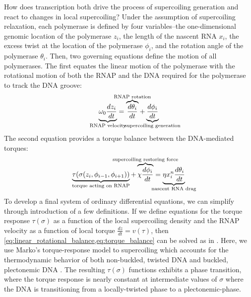 \documentclass[11pt]{article}
\begin{document}
How does transcription both drive the process of supercoiling generation and react to changes in local supercoiling? Under the assumption of supercoiling relaxation, each polymerase is defined by four variables--the one-dimensional genomic location of the polymerase \(z_i\), the length of the nascent RNA \(x_i\), the excess twist at the location of the polymerase \(\phi_i\), and the rotation angle of the polymerase \(\theta_i\). Then, two governing equations define the motion of all polymerases. The first equates the linear motion of the polymerase with the rotational motion of both the RNAP and the DNA required for the polymerase to track the DNA groove:
\begin{equation}
    \underbrace{\omega_0 \frac{dz_i}{dt}}_{\mathclap{\text{RNAP velocity}}} = \overbrace{\frac{d\theta_i}{dt}}^{\mathclap{\text{RNAP rotation}}} + \underbrace{\frac{d\phi_i}{dt}}_{\mathclap{\text{supercoiling generation}}}
\label{eq:linear_rotational_balance}
\end{equation}
The second equation provides a torque balance between the DNA-mediated torques:
\begin{equation}
    \underbrace{\tau(\sigma(z_i, \phi_{i-1}, \phi_{i+1}))}_{\mathclap{\text{torque acting on RNAP}}} + \overbrace{\chi \frac{d\phi_i}{dt}}^{\mathclap{\text{supercoiling restoring force}}}= \underbrace{\eta x_i^n \frac{d\theta_i}{dt}}_{\mathclap{\text{nascent RNA drag}}}
\label{eq:torque_balance}
\end{equation}
To develop a final system of ordinary differential equations, we can simplify through introduction of a few definitions. If we define equations for the torque response \(\tau(\sigma)\) as a function of the local supercoiling density and the RNAP velocity as a function of local torque \(\frac{dz}{dt} = v(\tau)\), then \cref{eq:linear_rotational_balance,eq:torque_balance} can be solved as in \textcite{sevierPropertiesGeneExpression2018}. Here, we use Marko's torque-response model to supercoiling which accounts for the thermodynamic behavior of both non-buckled, twisted DNA and buckled, plectonemic DNA \parencite{markoTorqueDynamicsLinking2007}. The resulting \(\tau(\sigma)\) functions exhibits a phase transition, where the torque response is nearly constant at intermediate values of \(\sigma\) where the DNA is transitioning from a locally-twisted phase to a plectonemic-phase.
\end{document}
